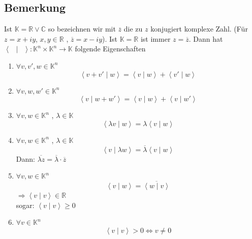 \subsection{Bemerkung} %
\label{sub:bemerkung}
Ist $\mathds{K} = \mathds{R} \vee \mathds{C}$ so bezeichnen wir mit $\overline{z} $ die zu $z$ konjugiert komplexe Zahl. 
(Für $z= x +iy$, $x,y \in \mathds{R}$ , $\overline{z} = x -iy$). Ist $\mathds{K} = \mathds{R}$ ist immer $z= \overline{z} $. Dann hat
$\left\langle \enspace \mid \enspace \right\rangle : \mathds{K}^n \times \mathds{K}^n \to \mathds{K}$ folgende Eigenschaften
\begin{enumerate}[1)]
	\item $\forall v, v', w \in \mathds{K}^n$
	\[
		\left\langle v+v' \mid w \right\rangle = \left\langle v \mid w \right\rangle + \left\langle v' \mid w \right\rangle
	\]
	\item $\forall v, w, w' \in \mathds{K}^n$
	\[
		\left\langle v \mid w + w' \right\rangle = \left\langle v \mid w \right\rangle + \left\langle v \mid w' \right\rangle
	\]
	\item $\forall v,w \in \mathds{K}^n$ , $\lambda \in \mathds{K}$
	\[
		\left\langle \lambda v \mid w \right\rangle = \lambda \left\langle v \mid w \right\rangle
	\]
	\item $\forall v,w \in \mathds{K}^n$ , $\lambda \in \mathds{K}$
	\[
		\left\langle v \mid \lambda w \right\rangle = \overline{\lambda} \left\langle v \mid w \right\rangle 
	\]
	Dann: $\overline{\lambda  z} = \overline{\lambda } \cdot \overline{z}$
	\item $\forall v,w \in \mathds{K}^n$
	\[
		\left\langle v \mid w \right\rangle = \overline{\left\langle w \mid v \right\rangle}
	\]
	$\Rightarrow \left\langle v \mid v \right\rangle \in \mathds{R}$ \\
	sogar: $\left\langle v \mid v \right\rangle \ge 0$
	\item $\forall v \in \mathds{K}^n$
	\[
		\left\langle v \mid v \right\rangle > 0 \Leftrightarrow v \not= 0
	\]
\end{enumerate}

